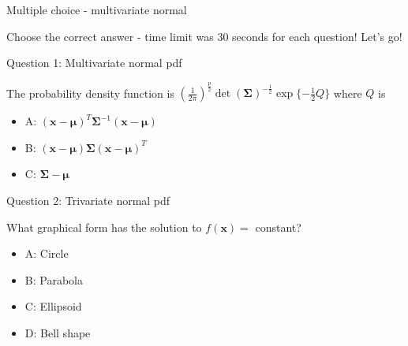 \documentclass[ignorenonframetext,]{beamer}
\providecommand{\tightlist}{%
  \setlength{\itemsep}{0pt}\setlength{\parskip}{0pt}}
\begin{document}
\begin{frame}

\begin{block}{Multiple choice - multivariate normal}

\vspace{2mm}

Choose the correct answer - time limit was 30 seconds for each question!
Let's go!

\vspace{2mm}

\begin{block}{Question 1: Multivariate normal pdf}

\vspace{2mm}

The probability density function is
\((\frac{1}{2\pi})^\frac{p}{2}\det(\boldsymbol\Sigma)^{-\frac{1}{2}}\exp\{-\frac{1}{2}Q\}\)
where \(Q\) is

\begin{itemize}
\tightlist
\item
  A:
  \((\boldsymbol{x}-\boldsymbol{\mu})^T\boldsymbol\Sigma^{-1}(\boldsymbol{x}-\boldsymbol{\mu})\)
\item
  B:
  \((\boldsymbol{x}-\boldsymbol{\mu})\boldsymbol\Sigma(\boldsymbol{x}-\boldsymbol{\mu})^T\)
\item
  C: \(\boldsymbol\Sigma-\boldsymbol{\mu}\)
\end{itemize}

\end{block}

\end{block}

\end{frame}

\begin{frame}

\begin{block}{Question 2: Trivariate normal pdf}

\vspace{2mm}

What graphical form has the solution to \(f(\boldsymbol{x})=\) constant?

\begin{itemize}
\tightlist
\item
  A: Circle
\item
  B: Parabola
\item
  C: Ellipsoid
\item
  D: Bell shape
\end{itemize}

\end{block}

\end{frame}
\end{document}
